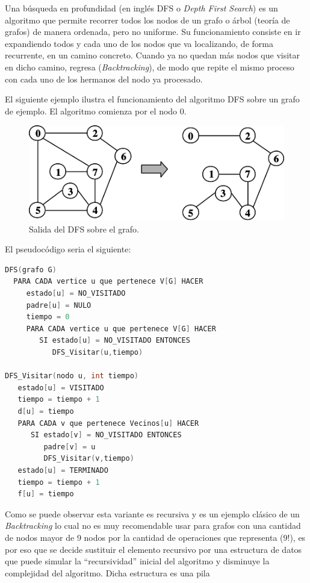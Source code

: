 Una búsqueda en profundidad (en inglés DFS o {\em Depth First Search}) es un algoritmo que permite recorrer todos los nodos de un grafo o árbol (teoría de grafos) de manera ordenada, pero no uniforme. Su funcionamiento consiste en ir expandiendo todos y cada uno de los nodos que va localizando, de forma recurrente, en un camino concreto. Cuando ya no quedan más nodos que visitar en dicho camino, regresa ({\em Backtracking}), de modo que repite el mismo proceso con cada uno de los hermanos del nodo ya procesado. 

El siguiente ejemplo ilustra el funcionamiento del algoritmo DFS sobre un grafo de ejemplo. El algoritmo comienza por el nodo 0.

\begin{figure}[h]
	\centering 
	\includegraphics[scale=0.8]{img/dfs}
	\caption{Salida del DFS sobre el grafo.}
	\label{contexto:figura5}
\end{figure}

El pseudocódigo seria el siguiente:
\begin{lstlisting}[language=C++]
DFS(grafo G)     
  PARA CADA vertice u que pertenece V[G] HACER             
     estado[u] = NO_VISITADO             
     padre[u] = NULO     
     tiempo = 0     
     PARA CADA vertice u que pertenece V[G] HACER             
        SI estado[u] = NO_VISITADO ENTONCES                     
           DFS_Visitar(u,tiempo)
	
DFS_Visitar(nodo u, int tiempo)     
   estado[u] = VISITADO     
   tiempo = tiempo + 1     
   d[u] = tiempo     
   PARA CADA v que pertenece Vecinos[u] HACER             
      SI estado[v] = NO_VISITADO ENTONCES                     
         padre[v] = u                     
	     DFS_Visitar(v,tiempo)     
   estado[u] = TERMINADO     
   tiempo = tiempo + 1     
   f[u] = tiempo
\end{lstlisting} 

Como se puede observar esta variante es recursiva y es un ejemplo clásico de un {\em Backtracking} lo cual no es muy recomendable usar para grafos con una cantidad de nodos mayor de 9 nodos por la cantidad de operaciones que representa (9!), es por eso que se decide sustituir el elemento recursivo por una estructura de datos que puede simular la “recursividad” inicial del algoritmo y disminuye la complejidad del algoritmo. Dicha estructura es una pila

